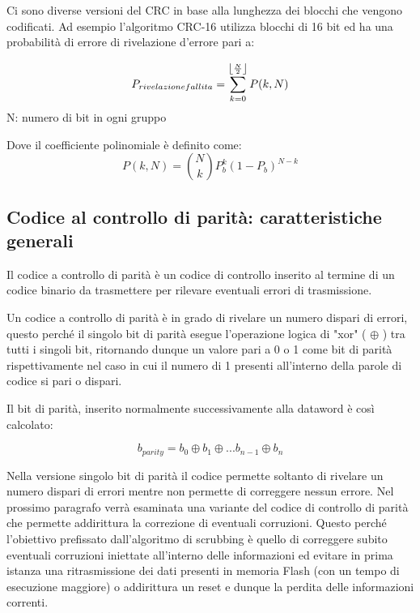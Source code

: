 \documentclass[LaM,binding=0.6cm,oneside]{../sapthesis}
\DeclarePairedDelimiter\floor{\lfloor}{\rfloor}
\begin{document}
Ci sono diverse versioni del CRC in base alla lunghezza dei blocchi che vengono codificati. Ad esempio l'algoritmo CRC-16 utilizza blocchi di 16 bit ed ha una probabilità di errore di rivelazione d'errore pari a:

\begin{equation}
    P_{rivelazione fallita} = \sum_{k=0}^{\floor*{\frac{N}{2}}} P(k,N)
\end{equation}
    N: numero di bit in ogni gruppo

Dove il coefficiente polinomiale è definito come:
\begin{equation}
    P(k,N) =  \binom{N}{k} P_{b}^{k} (1-P_{b})^{N-k}
\end{equation}    
\subsection{Codice al controllo di parità: caratteristiche generali}

Il codice  a  controllo  di  parità  è un codice di controllo inserito al termine di un codice binario da trasmettere per rilevare eventuali errori di trasmissione.

Un  codice  a  controllo  di  parità  è  in  grado  di  rivelare  un
numero dispari di errori, questo perché il singolo bit di parità esegue l'operazione logica di "xor" ( $\oplus{}$ ) tra tutti i singoli bit, ritornando dunque un valore pari a 0 o 1 come bit di parità rispettivamente nel caso in cui il numero di 1 presenti all'interno della parole di codice si pari o dispari.

Il bit di parità, inserito normalmente successivamente alla dataword è così calcolato:

\begin{equation}
    b_{parity} =b_{0} \oplus{}  b_{1} \oplus{}  ...b_{n-1} \oplus{} b_{n} 
\end{equation}

Nella versione singolo bit di parità il codice permette soltanto di rivelare un numero dispari di errori mentre non permette di correggere nessun errore.
\newline
Nel prossimo paragrafo verrà esaminata una variante del codice di controllo di parità che permette addirittura la correzione di eventuali corruzioni. Questo perché l'obiettivo prefissato dall'algoritmo di scrubbing è quello di correggere subito eventuali corruzioni iniettate all'interno delle informazioni ed evitare in prima istanza una ritrasmissione dei dati presenti in memoria Flash (con un tempo di esecuzione maggiore) o addirittura un reset e dunque la perdita delle informazioni correnti.
\end{document}
